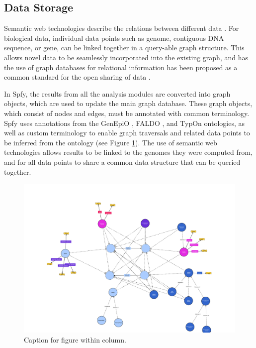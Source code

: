 \documentclass[a4,center,fleqn]{NAR}
\begin{document}
\subsection{Data Storage}
Semantic web technologies describe the relations between different data \cite{berners2001semantic}. For biological data, individual data points such as genome, contiguous DNA sequence, or gene, can be linked together in a query-able graph structure. This allows novel data to be seamlessly incorporated into the existing graph, and has the use of graph databases for relational information has been proposed as a common standard for the open sharing of data \cite{horrocks2005semantic}.

In Spfy, the results from all the analysis modules are converted into graph objects, which are used to update the main graph database. These graph objects, which consist of nodes and edges, must be annotated with common terminology. Spfy uses annotations from the GenEpiO \cite{griffiths2017context}, FALDO \cite{bolleman2016faldo}, and TypOn \cite{vaz2014typon} ontologies, as well as custom terminology to enable graph traversals and related data points to be inferred from the ontology (see Figure \ref{fig-ontology}). The use of semantic web technologies allows results to be linked to the genomes they were computed from, and for all data points to share a common data structure that can be queried together.

\begin{figure}[t]
\begin{center}
\includegraphics{images/spfy_ontology-1.svg}
\end{center}
\caption{Caption for figure within column.}
\label{fig-ontology}
\end{figure}
\end{document}
